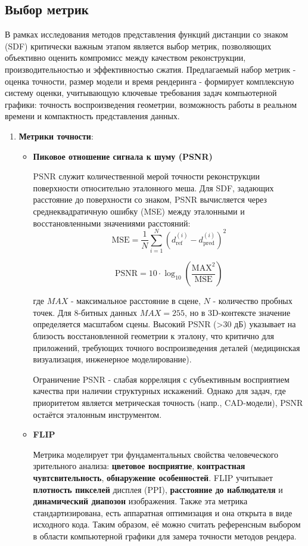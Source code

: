 \documentclass[a4paper,hidelinks,12pt]{article}
\begin{document}
\subsection{Выбор метрик}

В рамках исследования методов представления функций дистанции со знаком (SDF) критически 
важным этапом является выбор метрик, позволяющих объективно оценить компромисс между качеством 
реконструкции, производительностью и эффективностью сжатия. Предлагаемый набор метрик - оценка точности, 
размер модели и время рендеринга - формирует комплексную систему оценки, учитывающую ключевые 
требования задач компьютерной графики: точность воспроизведения геометрии, возможность работы в 
реальном времени и компактность представления данных.

\begin{enumerate}
	\item \textbf{Метрики точности}:
	
	\begin{itemize}
		\item \textbf{Пиковое отношение сигнала к шуму (PSNR)}
		\par
		PSNR служит количественной мерой точности реконструкции поверхности относительно эталонного меша. Для SDF, 
		задающих расстояние до поверхности со знаком, PSNR вычисляется через среднеквадратичную ошибку (MSE) между 
		эталонными и восстановленными значениями расстояний:
		$$
		\text{MSE} = \frac{1}{N} \sum_{i=1}^{N} (d_{\text{ref}}^{(i)} - d_{\text{pred}}^{(i)})^2
		$$
	
		$$
		\text{PSNR} = 10 \cdot \log_{10}\left(\frac{\text{MAX}^2}{\text{MSE}}\right)
		$$
	
		где $ MAX $ - максимальное расстояние в сцене, $ N $ - количество пробных точек. Для 8-битных данных 
		$ MAX = 255 $, но в 3D-контексте значение определяется масштабом сцены. Высокий PSNR (>30 дБ) 
		указывает на близость восстановленной геометрии к эталону, что критично для приложений, требующих точного 
		воспроизведения деталей (медицинская визуализация, инженерное моделирование).
		
		Ограничение PSNR - слабая корреляция с субъективным восприятием качества при наличии структурных искажений. 
		Однако для задач, где приоритетом является метрическая точность (напр., CAD-модели), PSNR остаётся эталонным инструментом.

		\item \textbf{FLIP}
		\par
		Метрика моделирует три фундаментальных свойства человеческого зрительного анализа: \textbf{цветовое восприятие}, \textbf{контрастная чувтсвительность},
		\textbf{обнаружение особенностей}. FLIP учитывает \textbf{плотность пикселей} дисплея (PPI), \textbf{расстояние до наблюдателя} и \textbf{динамический диапозон}
		изображения. Также эта метрика стандартизирована, есть аппаратная оптимизация и она открыта в виде исходного кода. Таким образом, её можно считать референсным выбором в области компьютерной графики
		для замера точности методов рендера.


\end{itemize}
\end{enumerate}
\end{document}
